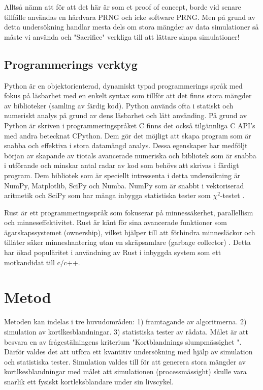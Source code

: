 \documentclass[swedish,a4paper]{article}
\begin{document}
Alltså nämn att för att det här är som et proof of concept, borde vid
senare tillfälle användas en hårdvara PRNG och icke software PRNG.
Men på grund av detta undersökning handlar mesta dels om stora mängder av data
simulationer så måste vi använda och "Sacrifice" verkliga till att lättare
skapa simulationer!
\subsection{Programmerings verktyg}
Python är en objektorienterad, dynamiskt typad programmerings språk med
fokus på läsbarhet med en enkelt syntax som tillför att det finns stora
mängder av biblioteker (samling av färdig kod).
Python används ofta i statiskt och numeriskt analys på grund av dens
läsbarhet och lätt använding. På grund av Python är skriven i
programmeringspråket C finns det också tilgännliga C API's med andra
betecknat CPython. Dem gör det möjligt att skapa program som är snabba
och effektiva i stora datamängd analys. Dessa egenskaper har medföljt
början av skapande av tiotals avancerade numeriska och
bibliotek som är snabba i utförande och minskar antal radar av kod som
behövs att skrivas i färdigt program. Dem bibliotek som är speciellt
intressenta i detta undersökning är NumPy, Matplotlib, SciPy och Numba.
NumPy som är snabbt i vektoriserad aritmetik och SciPy som har många
inbygga statistiska tester som $\chi^2$-testet \parencite{numpy, scipy}.

Rust är ett programmeringsspråk som fokuserar på
minnessäkerhet, parallellism och minneseffektivitet. Rust är känt för
sina avancerade funktioner som ägarskapssystemet (ownership), vilket
hjälper till att förhindra minnesläckor och tillåter säker
minneshantering utan en skräpsamlare (garbage collector)
\parencite{rust}. Detta har ökad populäritet i användning av Rust i
inbyggda system som ett motkandidat till c/c++. 

\section{Metod} 
Metoden kan indelas i tre huvudområden:
1) framtagande av algoritmerna. 
2) simulation av kortlkesblandningar. 
3) statistiska tester av rådata.
Målet är att besvara en av frågestälningens kriterium "Kortblandnings
slumpmässighet ". Därför valdes det att utföra ett kvantitiv undersökning med
hjälp av simulation och statistiska tester. Simulation valdes till för
att generera stora mängder av kortlkesblandningar med målet att
simulationen (processmässight) skulle vara snarlik ett fysiskt
kortleks\-blandare under sin livscykel. 
\end{document}
